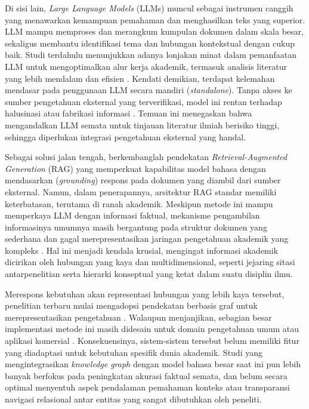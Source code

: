 Di sisi lain, \textit{Large Language Models} (LLMs) muncul sebagai instrumen canggih yang menawarkan kemampuan pemahaman dan menghasilkan teks yang superior. LLM mampu memproses dan merangkum kumpulan dokumen dalam skala besar, sekaligus membantu identifikasi tema dan hubungan kontekstual dengan cukup baik. Studi terdahulu menunjukkan adanya lonjakan minat dalam pemanfaatan LLM untuk mengoptimalkan alur kerja akademik, termasuk analisis literatur yang lebih mendalam dan efisien \cite{info:doi/10.2196/56537}. Kendati demikian, terdapat kelemahan mendasar pada penggunaan LLM secara mandiri (\textit{standalone}). Tanpa akses ke sumber pengetahuan eksternal yang terverifikasi, model ini rentan terhadap halusinasi atau fabrikasi informasi \cite{Cong-Lem03042025, 10.1145/3571730}. Temuan ini menegaskan bahwa mengandalkan LLM semata untuk tinjauan literatur ilmiah berisiko tinggi, sehingga diperlukan integrasi pengetahuan eksternal yang handal.

Sebagai solusi jalan tengah, berkembanglah pendekatan \textit{Retrieval-Augmented Generation} (RAG) yang memperkuat kapabilitas model bahasa dengan mendasarkan (\textit{grounding}) respons pada dokumen yang diambil dari sumber eksternal. Namun, dalam penerapannya, arsitektur RAG standar memiliki keterbatasan, terutama di ranah akademik. Meskipun metode ini mampu memperkaya LLM dengan informasi faktual, mekanisme pengambilan informasinya umumnya masih bergantung pada struktur dokumen yang sederhana dan gagal merepresentasikan jaringan pengetahuan akademik yang kompleks \cite{retrievalaugmentedgenerationlargelanguage}. Hal ini menjadi kendala krusial, mengingat informasi akademik dicirikan oleh hubungan yang kaya dan multidimensional, seperti jejaring sitasi antarpenelitian serta hierarki konseptual yang ketat dalam suatu disiplin ilmu.

Merespons kebutuhan akan representasi hubungan yang lebih kaya tersebut, penelitian terbaru mulai mengadopsi pendekatan berbasis graf untuk merepresentasikan pengetahuan \cite{edge2025localglobalgraphrag, guo2025lightragsimplefastretrievalaugmented, wu2024medicalgraphragsafe, qian2025memoragboostinglongcontext, peng2024graphretrievalaugmentedgenerationsurvey}. Walaupun menjanjikan, sebagian besar implementasi metode ini masih didesain untuk domain pengetahuan umum atau aplikasi komersial \cite{wu2024medicalgraphragsafe, edge2025localglobalgraphrag}. Konsekuensinya, sistem-sistem tersebut belum memiliki fitur yang diadaptasi untuk kebutuhan spesifik dunia akademik. Studi yang mengintegrasikan \textit{knowledge graph} dengan model bahasa besar saat ini pun lebih banyak berfokus pada peningkatan akurasi faktual semata, dan belum secara optimal menyentuh aspek pendalaman pemahaman konteks atau transparansi navigasi relasional antar entitas yang sangat dibutuhkan oleh peneliti.

